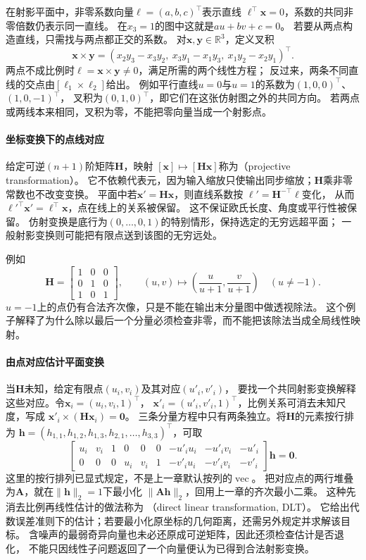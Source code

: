 在射影平面中，非零系数向量$\bm\ell=(a,b,c)^\top$表示直线
$\bm\ell^\top\bm x=0$，系数的共同非零倍数仍表示同一直线。
在$x_3=1$的图中这就是$au+bv+c=0$。
若要从两点构造直线，只需找与两点都正交的系数。
对$\bm x,\bm y\in\mathbb R^3$，定义叉积
\[
 \bm x\times\bm y=
 (x_2y_3-x_3y_2,\ x_3y_1-x_1y_3,\ x_1y_2-x_2y_1)^\top.
\]
两点不成比例时$\bm\ell=\bm x\times\bm y\ne0$，满足所需的两个线性方程；
反过来，两条不同直线的交点由$[\bm\ell_1\times\bm\ell_2]$给出。
例如平行直线$u=0$与$u=1$的系数为$(1,0,0)^\top$、$(1,0,-1)^\top$，
叉积为$(0,1,0)^\top$，即它们在这张仿射图之外的共同方向。
若两点或两线本来相同，叉积为零，不能把零向量当成一个射影点。

\paragraph{坐标变换下的点线对应}
给定可逆$(n+1)$阶矩阵$\bm H$，映射
$[\bm x]\mapsto[\bm H\bm x]$称为（projective transformation）。
它不依赖代表元，因为输入缩放只使输出同步缩放；$\bm H$乘非零常数也不改变变换。
平面中若$\bm x'=\bm H\bm x$，则直线系数按
$\bm\ell'=\bm H^{-\top}\bm\ell$变化，
从而$\bm\ell'^\top\bm x'=\bm\ell^\top\bm x$，点在线上的关系被保留。
这不保证欧氏长度、角度或平行性被保留。
仿射变换是底行为$(0,\ldots,0,1)$的特别情形，保持选定的无穷远超平面；
一般射影变换则可能把有限点送到该图的无穷远处。

例如
\[
 \bm H=\begin{bmatrix}1&0&0\\0&1&0\\1&0&1\end{bmatrix},
 \qquad (u,v)\longmapsto
 \left(\frac{u}{u+1},\frac{v}{u+1}\right)
 \quad (u\ne-1).
\]
$u=-1$上的点仍有合法齐次像，只是不能在输出末分量图中做透视除法。
这个例子解释了为什么除以最后一个分量必须检查非零，而不能把该除法当成全局线性映射。

\paragraph{由点对应估计平面变换}
当$\bm H$未知，给定有限点$(u_i,v_i)$及其对应$(u'_i,v'_i)$，
要找一个共同射影变换解释这些对应。令$\bm x_i=(u_i,v_i,1)^\top$，
$\bm x'_i=(u'_i,v'_i,1)^\top$，比例关系可消去未知尺度，写成
$\bm x'_i\times(\bm H\bm x_i)=\bm0$。
三条分量方程中只有两条独立。将$\bm H$的元素按行排为
$\bm h=(h_{1,1},h_{1,2},h_{1,3},h_{2,1},\ldots,h_{3,3})^\top$，可取
\begin{equation}
 \begin{bmatrix}
 u_i&v_i&1&0&0&0&-u'_i u_i&-u'_i v_i&-u'_i\\
 0&0&0&u_i&v_i&1&-v'_i u_i&-v'_i v_i&-v'_i
 \end{bmatrix}\bm h=\bm0.
 \label{eq:geometry-planar-dlt}
\end{equation}
这里的按行排列已显式规定，不是上一章默认按列的$\operatorname{vec}$。
把对应点的两行堆叠为$\bm A$，就在$\|\bm h\|_2=1$下最小化
$\|\bm A\bm h\|_2$，回用上一章的齐次最小二乘。
这种先消去比例再线性估计的做法称为
（direct linear transformation, DLT）。
它给出代数误差准则下的估计；若要最小化原坐标的几何距离，还需另外规定并求解该目标。
含噪声的最弱奇异向量也未必还原成可逆矩阵，因此还须检查估计是否退化，
不能只因线性子问题返回了一个向量便认为已得到合法射影变换。

